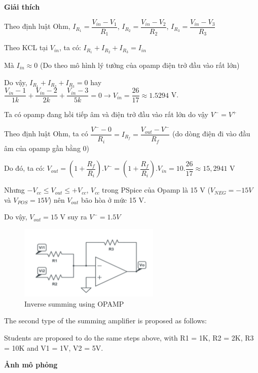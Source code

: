 \textbf{Giải thích}

Theo định luật Ohm, $I_{R_1} = \dfrac{V_{in} - V_1}{R_1}$, $I_{R_2} = \dfrac{V_{in} - V_2}{R_2}$, $I_{R_3} = \dfrac{V_{in} - V_3}{R_3}$

Theo KCL tại $V_{in}$, ta có: $I_{R_1} + I_{R_2} + I_{R_3} = I_{in}$ 

Mà $I_{in} \approx 0$ (Do theo mô hình lý tưởng của opamp điện trở đầu vào rất lớn)

Do vậy, $I_{R_1} + I_{R_2} + I_{R_3} = 0 $ hay $\dfrac{V_{in} - 1}{1k} + \dfrac{V_{in} - 2}{2k} + \dfrac{V_{in} - 3}{5k} = 0 \rightarrow V_{in} = \dfrac{26}{17} \approx 1.5294$ V.

Ta có opamp đang hồi tiếp âm và điện trở đầu vào rất lớn do vậy $V^- = V^+$ 

Theo định luật Ohm, ta có $\dfrac{V^- - 0}{R_i} = I_{R_f} = \dfrac{V_{out} - V^-}{R_f}$ (do dòng điện đi vào đầu âm của opamp gần bằng 0)

Do đó, ta có: $V_{out} = (1 + \dfrac{R_f}{R_i}).V^- = (1 + \dfrac{R_f}{R_i}).V_{in} = 10.\dfrac{26}{17} \approx 15,2941$ V

Nhưng $-V_{cc} \leq V_{out} \leq +V_{cc}$, $V_{cc}$ trong PSpice của Opamp là 15 V ($V_{NEG} = -15V$ và $V_{POS} = 15 V$) nên $V_{out}$ bão hòa ở mức 15 V.

Do vậy, $V_{out} = 15$ V suy ra $V^- = 1.5 V$

\begin{figure}[ht]
    \centering
    \includegraphics[width=0.6\textwidth]{graphics/ex1/f12.png}
    \caption{Inverse summing using OPAMP}
\end{figure}

The second type of the summing amplifier is proposed as follows:

Students are proposed to do the same steps above, with R1 = 1K, R2 = 2K, R3 = 10K and V1
= 1V, V2 = 5V.

\pagebreak

\textbf{Ảnh mô phỏng}

